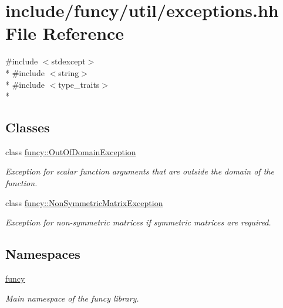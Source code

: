 \hypertarget{exceptions_8hh}{\section{include/funcy/util/exceptions.hh File Reference}
\label{exceptions_8hh}
}
{\ttfamily \#include $<$stdexcept$>$}\\*
{\ttfamily \#include $<$string$>$}\\*
{\ttfamily \#include $<$type\-\_\-traits$>$}\\*
\subsection*{Classes}
\begin{DoxyCompactItemize}
\item 
class \hyperlink{classfuncy_1_1OutOfDomainException}{funcy\-::\-Out\-Of\-Domain\-Exception}
\begin{DoxyCompactList}\small\item\em Exception for scalar function arguments that are outside the domain of the function. \end{DoxyCompactList}\item 
class \hyperlink{classfuncy_1_1NonSymmetricMatrixException}{funcy\-::\-Non\-Symmetric\-Matrix\-Exception}
\begin{DoxyCompactList}\small\item\em Exception for non-\/symmetric matrices if symmetric matrices are required. \end{DoxyCompactList}\end{DoxyCompactItemize}
\subsection*{Namespaces}
\begin{DoxyCompactItemize}
\item 
\hyperlink{namespacefuncy}{funcy}
\begin{DoxyCompactList}\small\item\em Main namespace of the funcy library. \end{DoxyCompactList}\end{DoxyCompactItemize}
